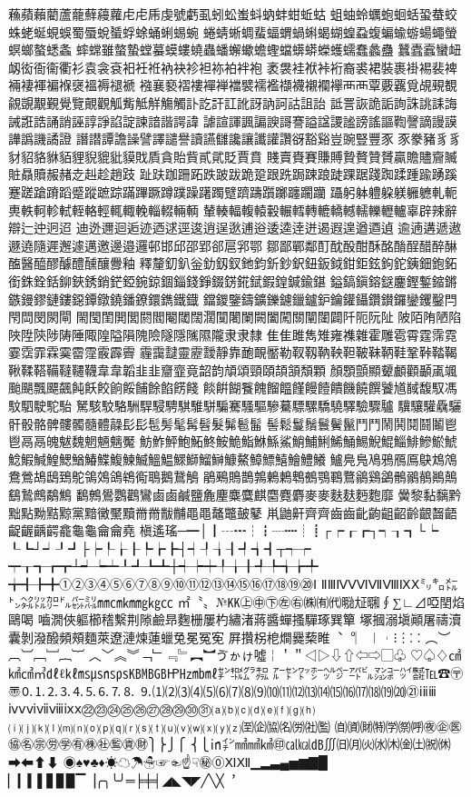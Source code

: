 蘓蘋藾藺蘆蘢蘚蘰蘿⾌虍乕虔號虧虱蚓蚣蚩蚪蚋蚌蚶蚯蛄
蛆蚰蛉蠣蚫蛔蛞蛩蛬蛟蛛蛯蜒蜆蜈蜀蜃蛻蜑蜉蜍蛹蜊蜴蜿
蜷蜻蜥蜩蜚蝠蝟蝸蝌蝎蝴蝗蝨蝮蝙蝓蝣蝪蠅螢螟螂螯蟋螽
蟀蟐雖螫蟄螳蟇蟆螻蟯蟲蟠蠏蠍蟾蟶蟷蠎蟒蠑蠖蠕蠢蠡蠱
蠶蠹蠧蠻衄衂衒衙衞衢衫袁衾袞衵衽袵衲袂袗袒袮袙袢袍
袤袰袿袱裃裄裔裘裙裝裹褂裼裴裨裲褄褌褊褓襃褞褥褪褫
襁襄褻褶褸襌褝襠襞襦襤襭襪襯襴襷⾑襾覃覈覊覓覘覡覩
覦覬覯覲覺覽覿觀觚觜觝觧觴觸訃訖訐訌訛訝訥訶詁詛詒
詆詈詼詭詬詢誅誂誄誨誡誑誥誦誚誣諄諍諂諚諫諳諧諤諱
謔諠諢諷諞諛謌謇謚諡謖謐謗謠謳鞫謦謫謾謨譁譌譏譎證
譖譛譚譫譟譬譯譴譽讀讌讎讒讓讖讙讚谺豁谿豈豌豎豐⾗
豕豢豬⾘豸豺貂貉貅貊貍貎貔豼貘戝貭貪貽貲貳貮貶賈賁
賤賣賚賽賺賻贄贅贊贇贏贍贐齎贓賍贔贖赧赭赱赳趁趙跂
趾趺跏跚跖跌跛跋跪跫跟跣跼踈踉跿踝踞踐踟蹂踵踰踴蹊
蹇蹉蹌蹐蹈蹙蹤蹠踪蹣蹕蹶蹲蹼躁躇躅躄躋躊躓躑躔躙躪
躡躬躰軆躱躾軅軈軋軛軣軼軻軫軾輊輅輕輒輙輓輜輟輛輌
輦輳輻輹轅轂輾轌轉轆轎轗轜轢轣轤辜辟辣辭辯辷迚迥迢
迪迯邇迴逅迹迺逑逕逡逍逞逖逋逧逶逵逹迸遏遐遑遒逎遉
逾遖遘遞遨遯遶隨遲邂遽邁邀邊邉邏邨邯邱邵郢郤扈郛鄂
鄒鄙鄲鄰酊酖酘酣酥酩酳酲醋醉醂醢醫醯醪醵醴醺釀釁釉
釋釐釖釟釡釛釼釵釶鈞釿鈔鈬鈕鈑鉞鉗鉅鉉鉤鉈銕鈿鉋鉐
銜銖銓銛鉚鋏銹銷鋩錏鋺鍄錮錙錢錚錣錺錵錻鍜鍠鍼鍮鍖
鎰鎬鎭鎔鎹鏖鏗鏨鏥鏘鏃鏝鏐鏈鏤鐚鐔鐓鐃鐇鐐鐶鐫鐵鐡
鐺鑁鑒鑄鑛鑠鑢鑞鑪鈩鑰鑵鑷鑽鑚鑼鑾钁鑿閂閇閊閔閖閘
閙閠閨閧閭閼閻閹閾闊濶闃闍闌闕闔闖關闡闥闢阡阨阮阯
陂陌陏陋陷陜陞陝陟陦陲陬隍隘隕隗險隧隱隲隰隴⾪隶隸
⾫隹雎雋雉雍襍雜霍雕雹霄霆霈霓霎霑霏霖霙霤霪霰霹霽
霾靄靆靈靂靉靜靠靤靦靨勒靫靱靹鞅靼鞁靺鞆鞋鞏鞐鞜鞨
鞦鞣鞳鞴韃韆韈⾱韋韜⾲韭齏韲竟韶韵頏頌頸頤頡頷頽顆
顏顋顫顯顰顱顴顳颪颯颱颶飄飃飆飩飫餃餉餒餔餘餡餝餞
餤餠餬餮餽餾饂饉饅饐饋饑饒饌饕馗馘馥馭馮馼駟駛駝駘
駑駭駮駱駲駻駸騁騏騅駢騙騫騷驅驂驀驃騾驕驍驛驗驟驢
驥驤驩驫驪骭骰骼髀髏髑髓體髞⾽髟髢髣髦髯髫髮髴髱髷
髻鬆鬘鬚鬟鬢鬣⾾鬥鬧鬨鬩鬪鬮⾿鬯鬲⿀魄魃魏魍魎魑魘
魴鮓鮃鮑鮖鮗鮟鮠鮨鮴鯀鯊鮹鯆鯏鯑鯒鯣鯢鯤鯔鯡鰺鯲鯱
鯰鰕鰔鰉鰓鰌鰆鰈鰒鰊鰄鰮鰛鰥鰤鰡鰰鱇鰲鱆鰾鱚鱠鱧鱶
鱸鳧鳬鳰鴉鴈鳫鴃鴆鴪鴦鶯鴣鴟鵄鴕鴒鵁鴿鴾鵆鵈鵝鵞鵤
鵑鵐鵙鵲鶉鶇鶫鵯鵺鶚鶤鶩鶲鷄鷁鶻鶸鶺鷆鷏鷂鷙鷓鷸鷦
鷭鷯鷽鸚鸛鸞⿄鹵鹹鹽麁麈麋麌麒麕麑麝⿆麥麩麸麪麭靡
黌黎黏黐黔黜點黝黠黥黨黯黴黶黷⿋黹黻黼⿌黽鼇鼈皷鼕
鼡鼬鼾齊⿑齒⿒齔齣齟齠齡齦齧齬齪齷齲齶龕龜⿔龠⿕堯
槇遙瑤─━│┃┄┅┆┇┈┉┊┋┌┍┎┏┐┑┒┓└┕
┖┗┘┙┚┛├┝┞┟┠┡┢┣┤┥┦┧┨┩┪┫┬┭┮
┯┰┱┲┳┴┵┶┷┸┹┺┻┼┽┾┿╀╁╂╃╄╅╆╇
╈╉╊╋①②③④⑤⑥⑦⑧⑨⑩⑪⑫⑬⑭⑮⑯⑰⑱⑲⑳Ⅰ
ⅡⅢⅣⅤⅥⅦⅧⅨⅩ㍉㌔㍍㌧㌶㍑㌍㌦㌫㍊㎜㎝㎞㎎㎏㏄
㎡〝〟№㏍㊤㊥㊦㊧㊨㈱㈲㈹㍾㍽㍼∮∑∟⊿啞𨳝焰鷗喝
嚙㵎俠軀櫛𥡴繫荆𨻶鹼昻麴栅屢杓繡渚蔣醬蟬搔驒琢巽簞
塚摑溺塡顚屠禱瀆囊剝潑醱頻頰麵萊遼漣煉蓮蠟兔冕冤𡨚
屛攢柺梎𤏐爨蔾睢︑︒︳︱︲⁝︙⁚︰︵︶︹︺﹇﹈︷︸
︿﹀︽︾﹁﹂﹃﹄︻︼ゔゕゖ噓￤＇＂◁▷⇩⇧⇦⇨▢♧
♡♤♢㎠㎢㎤㎥㎗ℓ㎘㎳㎲㎱㎰㎅㎆㎇㏋㎐㏔㎖㌢㌖㌘㌕
㌃㌣㍗㍂㌹㌻㌀㌱㍇㌞㌪㍿℡☎〶〠🄀⒈⒉⒊⒋⒌⒍⒎⒏
⒐⑴⑵⑶⑷⑸⑹⑺⑻⑼⑽⑾⑿⒀⒁⒂⒃⒄⒅⒆⒇㉑ⅰⅱⅲ
ⅳⅴⅵⅶⅷⅸⅹ㉒㉓㉔㉕㉖㉗㉘㉙㉚㉛⒜⒝⒞⒟⒠⒡⒢⒣
⒤⒥⒦⒧⒨⒩⒪⒫⒬⒭⒮⒯⒰⒱⒲⒳⒴⒵㉃㈽㈿㈴㈸㈳㈼
㉂㈾㈶㈵㈻㉀㈺㊰㊭㊩㊯㊔㊪㊘㊫㊒㊑㊓㊬㊮㊖⎫⎬⎭⎧
⎨⎩㏌㌅㎟㎣㎦㊞㎈㎉㏈∭㈰㈪㈫㈬㈭㈮㈯㈷㉁➡⬅⬆⬇
◉♠♥♣♦☀☁☂☃☞☜☝☟㊙⓪ⅪⅫ▁▂▃▄▅▆▇█
▏▎▍▌▋▊▉▔▕╭╮╰╯═╞╪╡◢◣◥◤╱╲╳︐


